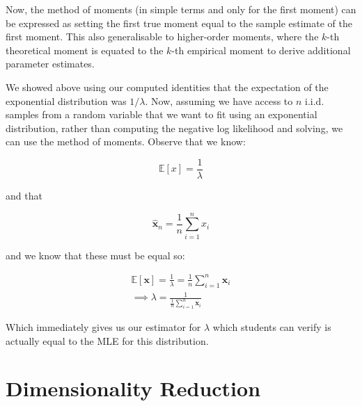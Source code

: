 Now, the method of moments (in simple terms and only for the first moment) can be expressed as setting the first true moment equal to the sample estimate of the first moment. This also generalisable to higher-order moments, where the \(k\)-th theoretical moment is equated to the \(k\)-th empirical moment to derive additional parameter estimates. \bigskip


We showed above using our computed identities that the expectation of the exponential distribution was $1/\lambda$. Now, assuming we have access to $n$ i.i.d. samples from a random variable that we want to fit using an exponential distribution, rather than computing the negative log likelihood and solving, we can use the method of moments. Observe that we know:

\[
    \mathbb{E}[x] = \frac{1}{\lambda}
\]

and that

\[
    \hat{\boldsymbol{x}}_{n} = \frac{1}{n}\sum_{i=1}^{n}x_{i}
\]

and we know that these must be equal so:

\begin{align*}
    \mathbb{E}[\boldsymbol{x}] = \frac{1}{\lambda} = \frac{1}{n}\sum_{i=1}^{n}\boldsymbol{x}_{i} \\
    \implies \lambda = \frac{1}{\frac{1}{n}\sum_{i=1}^{n}\boldsymbol{x}_{i}}
\end{align*}

Which immediately gives us our estimator for $\lambda$ which students can verify is actually equal to the MLE for this distribution. \bigskip

\section{Dimensionality Reduction}

